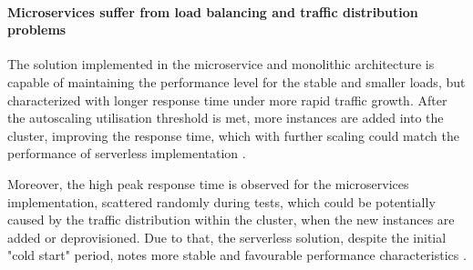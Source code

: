

\paragraph*{Microservices suffer from load balancing and traffic distribution problems}

The solution implemented in the microservice and monolithic architecture is capable of maintaining the performance level for the stable and smaller loads, but characterized with longer response time under more rapid traffic growth. After the autoscaling utilisation threshold is met, more instances are added into the cluster, improving the response time, which with further scaling could match the performance of serverless implementation \cite{ServerlessComputingAnInvestigationOfDeploymentEnvironmentsForWebAPIs}.

Moreover, the high peak response time is observed for the microservices implementation, scattered randomly during tests, which could be potentially caused by the traffic distribution within the cluster, when the new instances are added or deprovisioned. Due to that, the serverless solution, despite the initial "cold start" period, notes more stable and favourable performance characteristics \cite{MicroservicesvsServerlessAPerformanceComparisonOnCloudNativeWebApplication}.





